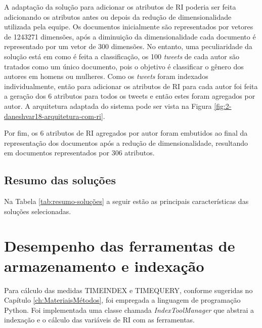 				A adaptação da solução para adicionar os atributos de RI poderia ser feita adicionando os atributos antes ou depois da redução de dimensionalidade utilizada pela equipe.
				Os documentos inicialmente são representados por vetores de 1243271 dimensões, após a diminuição da dimensionalidade cada documento é representado por um vetor de 300 dimensões.
				No entanto, uma peculiaridade da solução está em como é feita a classificação, os 100 \textit{tweets} de cada autor são tratados como um único documento, pois o objetivo é classificar o gênero dos autores em homens ou mulheres.
				Como os \textit{tweets} foram indexados individualmente, então para adicionar os atributos de RI para cada autor foi feita a geração dos 6 atributos para todos os tweets e então estes foram agregados por autor.
				A arquitetura adaptada do sistema pode ser vista na Figura \ref{fig:2-daneshvar18-arquitetura-com-ri}.

				

				Por fim, os 6 atributos de RI agregados por autor foram embutidos ao final da representação dos documentos após a redução de dimensionalidade, resultando em documentos representados por 306 atributos.


		\subsection{Resumo das soluções} \label{sec:ResumoDasSoluções}
			Na Tabela \ref{tab:resumo-soluções} a seguir estão as principais características das soluções selecionadas.

			

	\section{Desempenho das ferramentas de armazenamento e indexação} \label{sec:DesempenhoFerramentas}
		Para cálculo das medidas TIME\underscore{}INDEX e TIME\underscore{}QUERY, conforme sugeridas no Capítulo \ref{ch:MateriaisMétodos}, foi empregada a linguagem de programação Python.
		Foi implementada uma classe chamada \textit{IndexToolManager} que abstrai a indexação e o cálculo das variáveis de RI com as ferramentas. 

